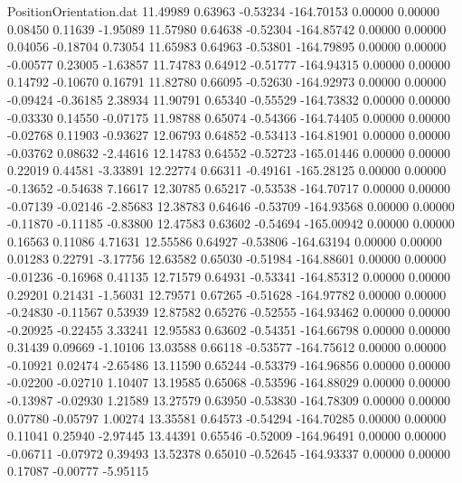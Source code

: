 \begin{filecontents}{PositionOrientation.dat}
  11.49989    0.63963   -0.53234  -164.70153    0.00000    0.00000    0.08450    0.11639   -1.95089
  11.57980    0.64638   -0.52304  -164.85742    0.00000    0.00000    0.04056   -0.18704    0.73054
  11.65983    0.64963   -0.53801  -164.79895    0.00000    0.00000   -0.00577    0.23005   -1.63857
  11.74783    0.64912   -0.51777  -164.94315    0.00000    0.00000    0.14792   -0.10670    0.16791
  11.82780    0.66095   -0.52630  -164.92973    0.00000    0.00000   -0.09424   -0.36185    2.38934
  11.90791    0.65340   -0.55529  -164.73832    0.00000    0.00000   -0.03330    0.14550   -0.07175
  11.98788    0.65074   -0.54366  -164.74405    0.00000    0.00000   -0.02768    0.11903   -0.93627
  12.06793    0.64852   -0.53413  -164.81901    0.00000    0.00000   -0.03762    0.08632   -2.44616
  12.14783    0.64552   -0.52723  -165.01446    0.00000    0.00000    0.22019    0.44581   -3.33891
  12.22774    0.66311   -0.49161  -165.28125    0.00000    0.00000   -0.13652   -0.54638    7.16617
  12.30785    0.65217   -0.53538  -164.70717    0.00000    0.00000   -0.07139   -0.02146   -2.85683
  12.38783    0.64646   -0.53709  -164.93568    0.00000    0.00000   -0.11870   -0.11185   -0.83800
  12.47583    0.63602   -0.54694  -165.00942    0.00000    0.00000    0.16563    0.11086    4.71631
  12.55586    0.64927   -0.53806  -164.63194    0.00000    0.00000    0.01283    0.22791   -3.17756
  12.63582    0.65030   -0.51984  -164.88601    0.00000    0.00000   -0.01236   -0.16968    0.41135
  12.71579    0.64931   -0.53341  -164.85312    0.00000    0.00000    0.29201    0.21431   -1.56031
  12.79571    0.67265   -0.51628  -164.97782    0.00000    0.00000   -0.24830   -0.11567    0.53939
  12.87582    0.65276   -0.52555  -164.93462    0.00000    0.00000   -0.20925   -0.22455    3.33241
  12.95583    0.63602   -0.54351  -164.66798    0.00000    0.00000    0.31439    0.09669   -1.10106
  13.03588    0.66118   -0.53577  -164.75612    0.00000    0.00000   -0.10921    0.02474   -2.65486
  13.11590    0.65244   -0.53379  -164.96856    0.00000    0.00000   -0.02200   -0.02710    1.10407
  13.19585    0.65068   -0.53596  -164.88029    0.00000    0.00000   -0.13987   -0.02930    1.21589
  13.27579    0.63950   -0.53830  -164.78309    0.00000    0.00000    0.07780   -0.05797    1.00274
  13.35581    0.64573   -0.54294  -164.70285    0.00000    0.00000    0.11041    0.25940   -2.97445
  13.44391    0.65546   -0.52009  -164.96491    0.00000    0.00000   -0.06711   -0.07972    0.39493
  13.52378    0.65010   -0.52645  -164.93337    0.00000    0.00000    0.17087   -0.00777   -5.95115

\end{filecontents}
